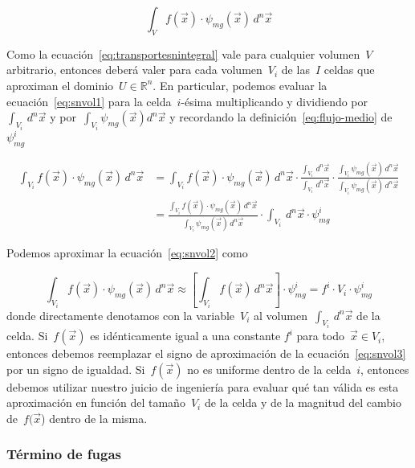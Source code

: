 \begin{equation}\label{eq:snvol1}
\int_{V} f(\vec{x}) \cdot \psi_{mg}(\vec{x}) \, d^n\vec{x}
\end{equation}

Como la ecuación~\eqref{eq:transportesnintegral} vale para cualquier volumen~$V$ arbitrario, entonces deberá valer para cada volumen~$V_i$ de las~$I$ celdas que aproximan el dominio~$U \in \mathbb{R}^n$. En particular, podemos evaluar la ecuación~\eqref{eq:snvol1} para la celda~$i$-ésima  multiplicando y dividiendo por~$\int_{V_i} \, d^n\vec{x}$ y por~$\int_{V_i} \psi_{mg}(\vec{x}) d^n\vec{x}$ y recordando la definición~\eqref{eq:flujo-medio} de~$\psi_{mg}^i$

\begin{align}\label{eq:snvol2}
\int_{V_i} f(\vec{x}) \cdot \psi_{mg}(\vec{x}) \, d^n\vec{x} &=
\int_{V_i} f(\vec{x}) \cdot \psi_{mg}(\vec{x}) \, d^n\vec{x} \cdot
\frac{\displaystyle \int_{V_i} \, d^n\vec{x}}{\displaystyle \int_{V_i} \, d^n\vec{x}} \cdot
\frac{\displaystyle \int_{V_i} \psi_{mg}(\vec{x}) \, d^n\vec{x}}{\displaystyle \int_{V_i} \psi_{mg}(\vec{x}) \, d^n\vec{x}} \nonumber \\
&=
\frac{\displaystyle \int_{V_i} f(\vec{x}) \cdot \psi_{mg}(\vec{x}) \, d^n\vec{x}}{\displaystyle \int_{V_i} \psi_{mg}(\vec{x}) \, d^n\vec{x}} \cdot
\int_{V_i} \, d^n\vec{x} \cdot \psi_{mg}^i
\end{align}

Podemos aproximar la ecuación~\eqref{eq:snvol2} como

\begin{equation}\label{eq:snvol3}
  \int_{V_i} f(\vec{x}) \cdot \psi_{mg}(\vec{x}) \, d^n\vec{x} \approx
  \left[ \int_{V_i} f(\vec{x}) \, d^n\vec{x} \right] \cdot \psi_{mg}^i
=
 f^i \cdot V_i \cdot \psi_{mg}^i
\end{equation}
%
donde directamente denotamos con la variable~$V_i$ al volumen~$\int_{V_i} \, d^n\vec{x}$ de la celda.
Si~$f(\vec{x})$ es idénticamente igual a una constante $f^i$ para todo~$\vec{x} \in V_i$, entonces debemos reemplazar el signo de aproximación de la ecuación~\eqref{eq:snvol3} por un signo de igualdad. Si~$f(\vec{x})$ no es uniforme dentro de la celda~$i$, entonces debemos utilizar nuestro juicio de ingeniería para evaluar qué tan válida es esta aproximación en función del tamaño~$V_i$ de la celda y de la magnitud del cambio de~$f(\vec{x}$) dentro de la misma.

\subsubsection{Término de fugas} %
\label{sec:snvolfugas}

